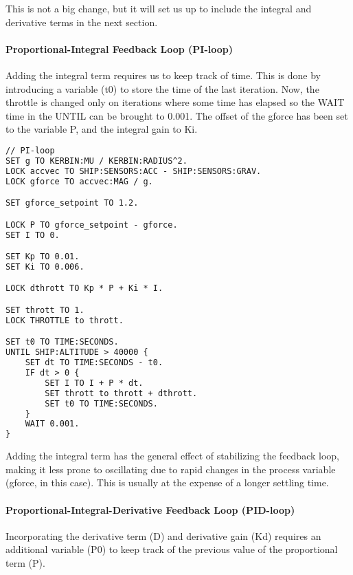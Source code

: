 This is not a big change, but it will set us up to include the integral and derivative terms in the next section.

\paragraph{Proportional-Integral Feedback Loop (PI-loop)}
Adding the integral term requires us to keep track of time. This is done by introducing a variable (t0) to store the time of the last iteration. Now, the throttle is changed only on iterations where some time has elapsed so the WAIT time in the UNTIL can be brought to 0.001. The offset of the gforce has been set to the variable P, and the integral gain to Ki.

\begin{lstlisting}[frame=single,language=XML]
// PI-loop
SET g TO KERBIN:MU / KERBIN:RADIUS^2.
LOCK accvec TO SHIP:SENSORS:ACC - SHIP:SENSORS:GRAV.
LOCK gforce TO accvec:MAG / g.

SET gforce_setpoint TO 1.2.

LOCK P TO gforce_setpoint - gforce.
SET I TO 0.

SET Kp TO 0.01.
SET Ki TO 0.006.

LOCK dthrott TO Kp * P + Ki * I.

SET thrott TO 1.
LOCK THROTTLE to thrott.

SET t0 TO TIME:SECONDS.
UNTIL SHIP:ALTITUDE > 40000 {
    SET dt TO TIME:SECONDS - t0.
    IF dt > 0 {
        SET I TO I + P * dt.
        SET thrott to thrott + dthrott.
        SET t0 TO TIME:SECONDS.
    }
    WAIT 0.001.
}
\end{lstlisting} 

Adding the integral term has the general effect of stabilizing the feedback loop, making it less prone to oscillating due to rapid changes in the process variable (gforce, in this case). This is usually at the expense of a longer settling time.

\paragraph{Proportional-Integral-Derivative Feedback Loop (PID-loop)}
Incorporating the derivative term (D) and derivative gain (Kd) requires an additional variable (P0) to keep track of the previous value of the proportional term (P).

